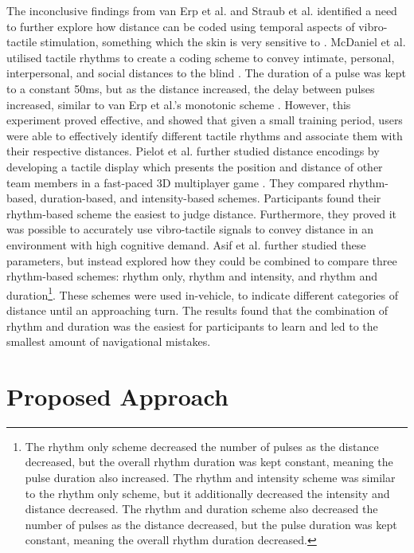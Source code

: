 \documentclass{interim}
\begin{document}
The inconclusive findings from van Erp et al. \cite{10.1145/1060581.1060585} and Straub et al. \cite{5326374} identified a need to further explore how distance can be coded using temporal aspects of vibro-tactile stimulation, something which the skin is very sensitive to \cite{doi:10.1068/p5014}. McDaniel et al. utilised tactile rhythms to create a coding scheme to convey intimate, personal, interpersonal, and social distances to the blind \cite{10.1145/1520340.1520718}. The duration of a pulse was kept to a constant 50ms, but as the distance increased, the delay between pulses increased, similar to van Erp et al.'s monotonic scheme \cite{10.1145/1060581.1060585}. However, this experiment proved effective, and showed that given a small training period, users were able to effectively identify different tactile rhythms and associate them with their respective distances. Pielot et al. further studied distance encodings by developing a tactile display which presents the position and distance of other team members in a fast-paced 3D multiplayer game \cite{10.1145/1753326.1753581}. They compared rhythm-based, duration-based, and intensity-based schemes. Participants found their rhythm-based scheme the easiest to judge distance. Furthermore, they proved it was possible to accurately use vibro-tactile signals to convey distance in an environment with high cognitive demand. Asif et al. \cite{10.1145/1868914.1868923} further studied these parameters, but instead explored how they could be combined to compare three rhythm-based schemes: rhythm only, rhythm and intensity, and rhythm and duration\footnote{The rhythm only scheme decreased the number of pulses as the distance decreased, but the overall rhythm duration was kept constant, meaning the pulse duration also increased. The rhythm and intensity scheme was similar to the rhythm only scheme, but it additionally decreased the intensity and distance decreased. The rhythm and duration scheme also decreased the number of pulses as the distance decreased, but the pulse duration was kept constant, meaning the overall rhythm duration decreased.}. These schemes were used in-vehicle, to indicate different categories of distance until an approaching turn. The results found that the combination of rhythm and duration was the easiest for participants to learn and led to the smallest amount of navigational mistakes.





\section{Proposed Approach}
\end{document}

